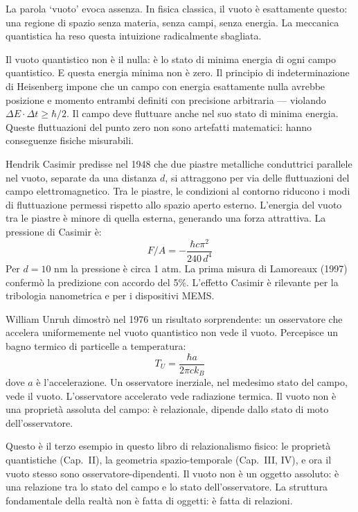 \documentclass[12pt,a4paper,openany]{book}
\newcommand{\sezione}[1]{\vspace{1.2em}{\large\bfseries #1}\vspace{0.5em}\par}
\begin{document}
La parola `vuoto' evoca assenza. In fisica classica, il vuoto è esattamente questo: una regione di spazio senza materia, senza campi, senza energia. La meccanica quantistica ha reso questa intuizione radicalmente sbagliata.

Il vuoto quantistico non è il nulla: è lo stato di minima energia di ogni campo quantistico. E questa energia minima non è zero. Il principio di indeterminazione di Heisenberg impone che un campo con energia esattamente nulla avrebbe posizione e momento entrambi definiti con precisione arbitraria — violando $\Delta E \cdot \Delta t \geq \hbar/2$. Il campo deve fluttuare anche nel suo stato di minima energia. Queste fluttuazioni del punto zero non sono artefatti matematici: hanno conseguenze fisiche misurabili.

\sezione{L'effetto Casimir}

Hendrik Casimir predisse nel 1948 che due piastre metalliche conduttrici parallele nel vuoto, separate da una distanza $d$, si attraggono per via delle fluttuazioni del campo elettromagnetico. Tra le piastre, le condizioni al contorno riducono i modi di fluttuazione permessi rispetto allo spazio aperto esterno. L'energia del vuoto tra le piastre è minore di quella esterna, generando una forza attrattiva. La pressione di Casimir è:
\[
F/A = -\frac{\hbar c\pi^2}{240\,d^4}
\]
Per $d = 10$ nm la pressione è circa 1 atm. La prima misura di Lamoreaux (1997) confermò la predizione con accordo del 5\%. L'effetto Casimir è rilevante per la tribologia nanometrica e per i dispositivi MEMS.

\sezione{L'effetto Unruh: il vuoto dipende dall'osservatore}

William Unruh dimostrò nel 1976 un risultato sorprendente: un osservatore che accelera uniformemente nel vuoto quantistico non vede il vuoto. Percepisce un bagno termico di particelle a temperatura:
\[
T_U = \frac{\hbar a}{2\pi c k_B}
\]
dove $a$ è l'accelerazione. Un osservatore inerziale, nel medesimo stato del campo, vede il vuoto. L'osservatore accelerato vede radiazione termica. Il vuoto non è una proprietà assoluta del campo: è relazionale, dipende dallo stato di moto dell'osservatore.

Questo è il terzo esempio in questo libro di relazionalismo fisico: le proprietà quantistiche (Cap.~II), la geometria spazio-temporale (Cap.~III, IV), e ora il vuoto stesso sono osservatore-dipendenti. Il vuoto non è un oggetto assoluto: è una relazione tra lo stato del campo e lo stato dell'osservatore. La struttura fondamentale della realtà non è fatta di oggetti: è fatta di relazioni.
\end{document}
